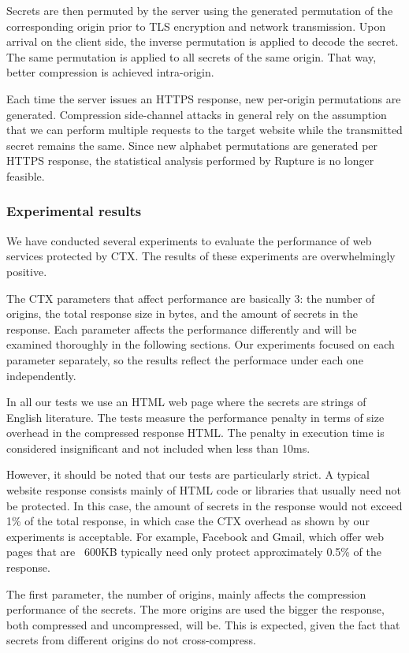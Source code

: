 \documentclass[conference, letterpaper, 10pt]{IEEEtran}
\begin{document}
Secrets are then permuted by the server using the generated permutation of the
corresponding origin prior to TLS encryption and network transmission. Upon
arrival on the client side, the inverse permutation is applied to decode the
secret. The same permutation is applied to all secrets of the same origin. That
way, better compression is achieved intra-origin.

Each time the server issues an HTTPS response, new per-origin permutations are
generated. Compression side-channel attacks in general rely on the assumption that we can
perform multiple requests to the target website while the transmitted secret
remains the same. Since new alphabet permutations are generated per HTTPS
response, the statistical analysis performed by Rupture is no longer feasible.

\subsubsection{Experimental results}

We have conducted several experiments to evaluate the performance of web
services protected by CTX. The results of these experiments are overwhelmingly
positive.

The CTX parameters that affect performance are basically 3: the number of
origins, the total response size in bytes, and the amount of
secrets in the response. Each parameter affects the performance differently and
will be examined thoroughly in the following sections. Our experiments focused
on each parameter separately, so the results reflect the performace under each
one independently.

In all our tests we use an HTML web page where the secrets are strings of
English literature. The tests measure the performance penalty in terms of size
overhead in the compressed response HTML. The penalty in execution time is
considered insignificant and not included when less than 10ms.

However, it should be noted that our tests are particularly strict. A typical
website response consists mainly of HTML code or libraries that usually need not
be protected. In this case, the amount of secrets in the response would not
exceed 1\% of the total response, in which case the CTX overhead as shown by our
experiments is acceptable. For example, Facebook and Gmail, which offer web
pages that are ~600KB typically need only protect approximately 0.5\% of the
response.

The first parameter, the number of origins, mainly affects the compression
performance of the secrets. The more origins are used the bigger the response,
both compressed and uncompressed, will be. This is expected, given the fact that
secrets from different origins do not cross-compress.
\end{document}
